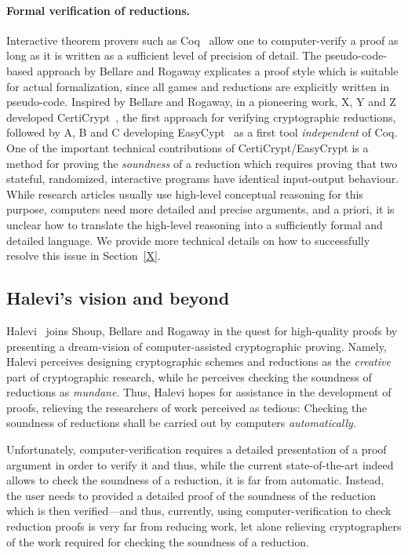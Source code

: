 \paragraph{Formal verification of reductions.} 
Interactive theorem provers such as Coq~\cite{X} allow one to computer-verify a
proof as long as it is written as a sufficient level of precision of detail.
The pseudo-code-based approach by Bellare and Rogaway explicates a proof style which is suitable for actual formalization, since all games and reductions are explicitly written in pseudo-code. Inspired by Bellare and Rogaway, in a pioneering work, X, Y and Z developed CertiCrypt~\cite{X}, the first approach for verifying cryptographic reductions, followed by A, B and C developing EasyCypt~\cite{X} as a first tool \emph{independent} of Coq. One of the important technical contributions of CertiCrypt/EasyCrypt is a method for proving the \emph{soundness} of a reduction which requires proving that two stateful, randomized, interactive programs have identical input-output behaviour. While research articles usually use high-level conceptual reasoning for this purpose, computers need more detailed and precise arguments, and a priori, it is unclear how to translate the high-level reasoning into a sufficiently formal and detailed language. We provide more technical details on how to successfully resolve this issue in Section~\ref{X}.

\subsection{Halevi's vision and beyond}
Halevi~\cite{X} joins Shoup, Bellare and Rogaway in the quest for
high-quality proofs by presenting a dream-vision of computer-assisted 
cryptographic proving. Namely, Halevi perceives designing cryptographic 
schemes and reductions as the \emph{creative} part of cryptographic research, 
while he perceives checking the soundness of reductions as \emph{mundane}. 
Thus, Halevi hopes for assistance in the development of proofs, relieving 
the researchers of work perceived as tedious: Checking the soundness 
of reductions shall be carried out by computers \emph{automatically}.

Unfortunately, computer-verification requires a detailed presentation of a 
proof argument in order to verify it and thus, while the current state-of-the-art
indeed allows to check the soundness of a reduction, it is far from automatic.
Instead, the user needs to provided a detailed proof of the soundness of the
reduction which is then verified---and thus, currently, using computer-verification
to check reduction proofs is very far from reducing work, let alone relieving
cryptographers of the work required for checking the soundness of a reduction.

